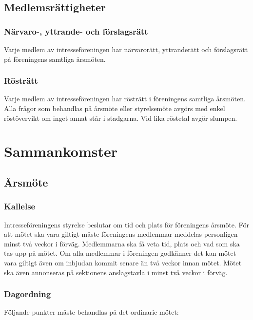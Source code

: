 \documentclass[11pt, noincludeaddress]{classes/cthit}
\begin{document}
\subsection{Medlemsrättigheter}

\subsubsection{Närvaro-, yttrande- och förslagsrätt}
Varje medlem av intresseföreningen har närvarorätt, yttranderätt och förslagsrätt på föreningens samtliga årsmöten.

\subsubsection{Rösträtt}
Varje medlem av intresseföreningen har rösträtt i föreningens samtliga årsmöten. Alla frågor som behandlas på årsmöte eller styrelsemöte avgörs med enkel röstövervikt om inget annat står i stadgarna. Vid lika röstetal avgör slumpen.

\section{Sammankomster}

\subsection{Årsmöte}

\subsubsection{Kallelse}
Intresseföreningens styrelse beslutar om tid och plats för föreningens årsmöte.
För att mötet ska vara giltigt måste föreningens medlemmar meddelas personligen minst två veckor i förväg. Medlemmarna ska få veta tid, plats och vad som ska tas upp på mötet.
Om alla medlemmar i föreningen godkänner det kan mötet vara giltigt även om inbjudan kommit senare än två veckor innan mötet.
Mötet ska även annonseras på sektionens anslagstavla i minst två veckor i förväg.

\subsubsection{Dagordning}
Följande punkter måste behandlas på det ordinarie mötet:
\end{document}
